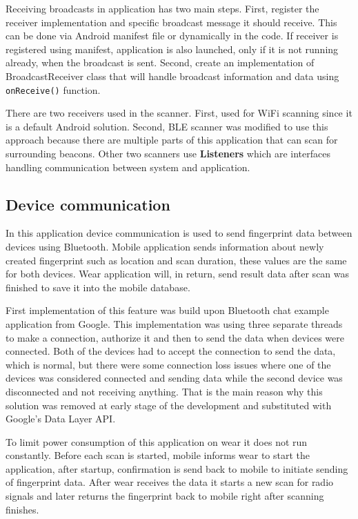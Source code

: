 Receiving broadcasts in application has two main steps. First, register the receiver implementation and specific broadcast message it should receive. This can be done via Android manifest file or dynamically in the code. If receiver is registered using manifest, application is also launched, only if it is not running already, when the broadcast is sent. Second, create an implementation of BroadcastReceiver class that will handle broadcast information and data using \verb|onReceive()| function.

There are two receivers used in the scanner. First, used for WiFi scanning since it is a default Android solution. Second, BLE scanner was modified to use this approach because there are multiple parts of this application that can scan for surrounding beacons. Other two scanners use \textbf{Listeners} which are interfaces handling communication between system and application.

\subsection{Device communication}\label{subsec:DeviceCommunication}
In this application device communication is used to send fingerprint data between devices using Bluetooth. Mobile application sends information about newly created fingerprint such as location and scan duration, these values are the same for both devices. Wear application will, in return, send result data after scan was finished to save it into the mobile database.

First implementation of this feature was build upon Bluetooth chat example application from Google. This implementation was using three separate threads to make a connection, authorize it and then to send the data when devices were connected. Both of the devices had to accept the connection to send the data, which is normal, but there were some connection loss issues where one of the devices was considered connected and sending data while the second device was disconnected and not receiving anything. That is the main reason why this solution was removed at early stage of the development and substituted with Google's Data Layer API.

To limit power consumption of this application on wear it does not run constantly. Before each scan is started, mobile informs wear to start the application, after startup, confirmation is send back to mobile to initiate sending of fingerprint data. After wear receives the data it starts a new scan for radio signals and later returns the fingerprint back to mobile right after scanning finishes.


